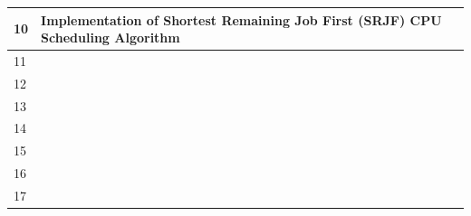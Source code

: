 \documentclass[10pt,a4paper,portrait]{article}
\begin{document}
\begin{center}
{\begin{tabularx}{\linewidth}{|>{\centering\arraybackslash}m{1.6cm}|>{\raggedright\arraybackslash}X|>{\centering\arraybackslash}m{1.5cm}|}
\hline
\rowcolor{cardbg}
{\color{primary}\sffamily\bfseries\footnotesize 10} & {\sffamily\footnotesize\color{darkslate} Implementation of Shortest Remaining Job First (SRJF) CPU Scheduling Algorithm} & \\
\hline
\rowcolor{white}
{\color{mutedgray}\sffamily\footnotesize 11} & & \\
\hline
\rowcolor{cardbg}
{\color{mutedgray}\sffamily\footnotesize 12} & & \\
\hline
\rowcolor{white}
{\color{mutedgray}\sffamily\footnotesize 13} & & \\
\hline
\rowcolor{cardbg}
{\color{mutedgray}\sffamily\footnotesize 14} & & \\
\hline
\rowcolor{white}
{\color{mutedgray}\sffamily\footnotesize 15} & & \\
\hline
\rowcolor{cardbg}
{\color{mutedgray}\sffamily\footnotesize 16} & & \\
\hline
\rowcolor{white}
{\color{mutedgray}\sffamily\footnotesize 17} & & \\
\hline
\end{tabularx}%
}
\end{center}

\vspace{0.20cm}
\end{document}
